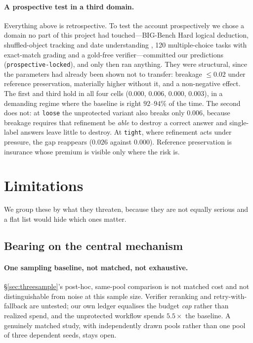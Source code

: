 \documentclass{article}
\begin{document}
\paragraph{A prospective test in a third domain.} Everything above is
retrospective. To test the account prospectively we chose a domain no part of
this project had touched---BIG-Bench Hard logical deduction, shuffled-object
tracking and date understanding \citep{suzgun2023bbh}, 120 multiple-choice tasks
with exact-match grading and a gold-free verifier---committed our predictions
(\texttt{prospective-locked}), and only then ran anything. They were structural,
since the parameters had already been shown not to transfer: breakage
$\le 0.02$ under reference preservation, materially higher without it, and a
non-negative effect. The first and third hold in all four cells ($0.000$, $0.006$, $0.000$,
$0.003$), in a demanding regime where the baseline is right $92$--$94\%$ of the
time. The second does not: at \texttt{loose} the unprotected variant also breaks
only $0.006$, because breakage requires that refinement be \emph{able} to destroy
a correct answer and single-label answers leave little to destroy. At
\texttt{tight}, where refinement acts under pressure, the gap reappears ($0.026$
against $0.000$). Reference preservation is insurance whose premium is visible
only where the risk is.

\section{Limitations}
\label{sec:limitations}

We group these by what they threaten, because they are not equally serious and
a flat list would hide which ones matter.

\subsection*{Bearing on the central mechanism}

\paragraph{One sampling baseline, not matched, not exhaustive.}
\S\ref{sec:threesample}'s post-hoc, same-pool comparison is not matched cost
and not distinguishable from noise at this sample size. Verifier reranking and
retry-with-fallback are untested; our own ledger equalises the budget
\emph{cap} rather than realized spend, and the
unprotected workflow spends $5.5\times$ the baseline. A genuinely matched
study, with independently drawn pools rather than one pool of three dependent
seeds, stays open.
\end{document}
